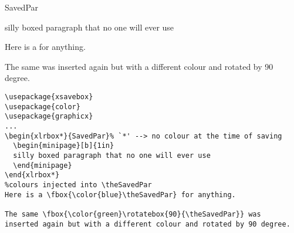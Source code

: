 \documentclass[a4paper]{article}
\begin{document}
\begin{xlrbox*}{SavedPar}
  \begin{minipage}[b]{1in}
  silly boxed paragraph that no one will ever use
  \end{minipage}
\end{xlrbox*}%
Here is a \fbox{\color{blue}\theSavedPar} for anything.

The same  was inserted again but with a different colour and rotated by 90 degree.

\begin{Verbatim}
\usepackage{xsavebox}  
\usepackage{color}
\usepackage{graphicx}
...
\begin{xlrbox*}{SavedPar}% `*' --> no colour at the time of saving
  \begin{minipage}[b]{1in}
  silly boxed paragraph that no one will ever use
  \end{minipage}
\end{xlrbox*}
%colours injected into \theSavedPar
Here is a \fbox{\color{blue}\theSavedPar} for anything.

The same \fbox{\color{green}\rotatebox{90}{\theSavedPar}} was
inserted again but with a different colour and rotated by 90 degree.
\end{Verbatim}
\end{document}
